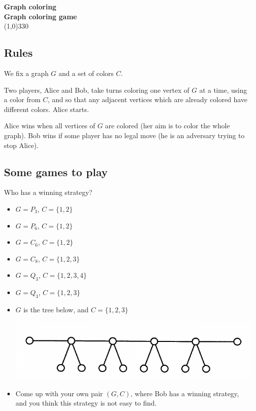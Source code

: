 \documentclass[a4paper]{article}
\begin{document}
\pagestyle{empty}
\begin{center}
	{\Large\bf Graph coloring}\\
	{\large\bf Graph coloring game}\\
	\line(1,0){330}
\end{center}

\subsection*{Rules}
\medskip

We fix a graph $G$ and a set of colors $C$.

Two players, Alice and Bob, take turns coloring one vertex of $G$ at a time, using a color from $C$, and so that any adjacent vertices which are already colored have different colors. Alice starts. 

Alice wins when all vertices of $G$ are colored (her aim is to color the whole graph). Bob wins if some player has no legal move (he is an adversary trying to stop Alice).

\subsection*{Some games to play}
\medskip

Who has a winning strategy?
\begin{itemize}
\item $G=P_3$, $C=\{1,2\}$
\item $G=P_6$, $C=\{1,2\}$
\item $G=C_6$, $C=\{1,2\}$
\item $G=C_8$, $C=\{1,2,3\}$
\item $G=Q_3$, $C=\{1,2,3,4\}$
\item $G=Q_3$, $C=\{1,2,3\}$
\item $G$ is the tree below, and $C=\{1,2,3\}$
\begin{center}
\includegraphics[scale=0.5]{mf4.png}
\end{center}
\item Come up with your own pair $(G,C)$, where Bob has a winning strategy, and you think this strategy is not easy to find.
\end{itemize}
\end{document}

